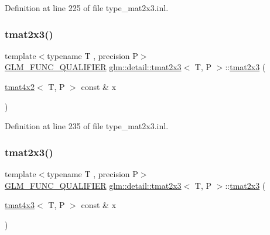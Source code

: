 Definition at line 225 of file type\+\_\+mat2x3.\+inl.

\mbox{\label{structglm_1_1detail_1_1tmat2x3_acc53a40969e8baec1323cbcd3db5021f}} 
\subsubsection{\texorpdfstring{tmat2x3()}{tmat2x3()}\hspace{0.1cm}{\footnotesize\ttfamily [17/22]}}
{\footnotesize\ttfamily template$<$typename T , precision P$>$ \\
\hyperlink{setup_8hpp_a33fdea6f91c5f834105f7415e2a64407}{G\+L\+M\+\_\+\+F\+U\+N\+C\+\_\+\+Q\+U\+A\+L\+I\+F\+I\+ER} \hyperlink{structglm_1_1detail_1_1tmat2x3}{glm\+::detail\+::tmat2x3}$<$ T, P $>$\+::\hyperlink{structglm_1_1detail_1_1tmat2x3}{tmat2x3} (\begin{DoxyParamCaption}\item[{\hyperlink{structglm_1_1detail_1_1tmat4x2}{tmat4x2}$<$ T, P $>$ const \&}]{x }\end{DoxyParamCaption})\hspace{0.3cm}{\ttfamily [explicit]}}



Definition at line 235 of file type\+\_\+mat2x3.\+inl.

\mbox{\label{structglm_1_1detail_1_1tmat2x3_a954965401031a46da66fcbb18536ead0}} 
\subsubsection{\texorpdfstring{tmat2x3()}{tmat2x3()}\hspace{0.1cm}{\footnotesize\ttfamily [18/22]}}
{\footnotesize\ttfamily template$<$typename T , precision P$>$ \\
\hyperlink{setup_8hpp_a33fdea6f91c5f834105f7415e2a64407}{G\+L\+M\+\_\+\+F\+U\+N\+C\+\_\+\+Q\+U\+A\+L\+I\+F\+I\+ER} \hyperlink{structglm_1_1detail_1_1tmat2x3}{glm\+::detail\+::tmat2x3}$<$ T, P $>$\+::\hyperlink{structglm_1_1detail_1_1tmat2x3}{tmat2x3} (\begin{DoxyParamCaption}\item[{\hyperlink{structglm_1_1detail_1_1tmat4x3}{tmat4x3}$<$ T, P $>$ const \&}]{x }\end{DoxyParamCaption})\hspace{0.3cm}{\ttfamily [explicit]}}




